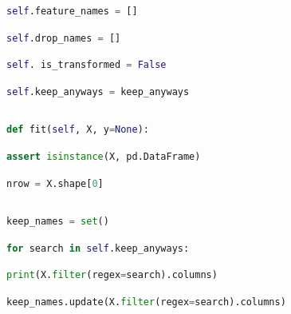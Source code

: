 \documentclass[
  11pt,
  a4paper,
  DIV=12,captions=tableheading,oneside]{scrbook}
\begin{document}
\begin{lstlisting}[language=Python,stepnumber=2,basicstyle=\footnotesize]
        self.feature_names = []\end{lstlisting}
\begin{lstlisting}[language=Python,stepnumber=2,basicstyle=\footnotesize]
        self.drop_names = []\end{lstlisting}
\begin{lstlisting}[language=Python,stepnumber=2,basicstyle=\footnotesize]
        self. is_transformed = False\end{lstlisting}
\begin{lstlisting}[language=Python,stepnumber=2,basicstyle=\footnotesize]
        self.keep_anyways = keep_anyways\end{lstlisting}
\begin{lstlisting}[language=Python,stepnumber=2,basicstyle=\footnotesize]
\end{lstlisting}
\begin{lstlisting}[language=Python,stepnumber=2,basicstyle=\footnotesize]
    def fit(self, X, y=None):\end{lstlisting}
\begin{lstlisting}[language=Python,stepnumber=2,basicstyle=\footnotesize]
        assert isinstance(X, pd.DataFrame)\end{lstlisting}
\begin{lstlisting}[language=Python,stepnumber=2,basicstyle=\footnotesize]
        nrow = X.shape[0]\end{lstlisting}
\begin{lstlisting}[language=Python,stepnumber=2,basicstyle=\footnotesize]
\end{lstlisting}
\begin{lstlisting}[language=Python,stepnumber=2,basicstyle=\footnotesize]
        keep_names = set()\end{lstlisting}
\begin{lstlisting}[language=Python,stepnumber=2,basicstyle=\footnotesize]
        for search in self.keep_anyways:\end{lstlisting}
\begin{lstlisting}[language=Python,stepnumber=2,basicstyle=\footnotesize]
            print(X.filter(regex=search).columns)\end{lstlisting}
\begin{lstlisting}[language=Python,stepnumber=2,basicstyle=\footnotesize]
            keep_names.update(X.filter(regex=search).columns)\end{lstlisting}
\end{document}
